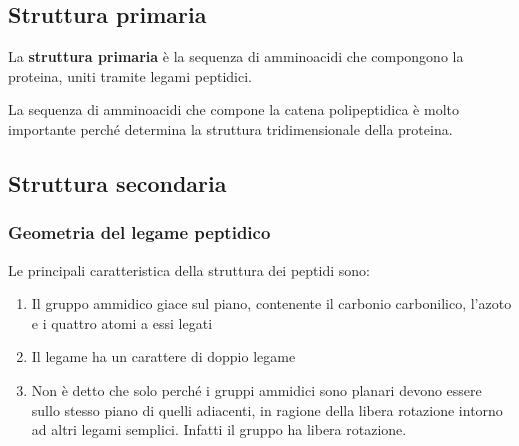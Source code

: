 \subsection{Struttura primaria}
La \textbf{struttura primaria} è la sequenza di amminoacidi che compongono la proteina, uniti tramite legami peptidici.

La sequenza di amminoacidi che compone la catena polipeptidica è molto importante perché determina la struttura tridimensionale della proteina.

\subsection{Struttura secondaria}
\subsubsection{Geometria del legame peptidico}
Le principali caratteristica della struttura dei peptidi sono:
\begin{enumerate}
	\item Il gruppo ammidico giace sul piano, contenente il carbonio carbonilico, l'azoto e i quattro atomi a essi legati
	\item Il legame  ha un carattere di doppio legame
	\item Non è detto che solo perché i gruppi ammidici sono planari devono essere sullo stesso piano di quelli adiacenti, in ragione della libera rotazione intorno ad altri legami semplici. Infatti il gruppo  ha libera rotazione.
\end{enumerate}

